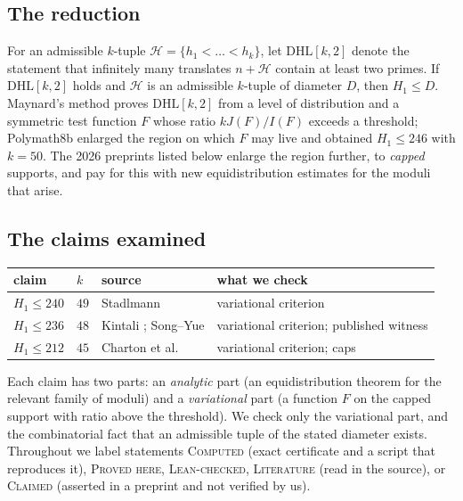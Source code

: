 \documentclass[11pt]{amsart}
\theoremstyle{definition}
\theoremstyle{remark}
\newcommand{\lbl}[1]{\textup{\textsc{#1}}}
\newcommand{\DHL}{\mathrm{DHL}}
\begin{document}
\subsection*{The reduction}
For an admissible $k$-tuple $\mathcal H=\{h_1<\dots<h_k\}$, let $\DHL[k,2]$
denote the statement that infinitely many translates $n+\mathcal H$ contain at
least two primes. If $\DHL[k,2]$ holds and $\mathcal H$ is an admissible
$k$-tuple of diameter $D$, then $H_1\le D$. Maynard's method \cite{May15}
proves $\DHL[k,2]$ from a level of distribution and a symmetric test function
$F$ whose ratio $kJ(F)/I(F)$ exceeds a threshold; Polymath8b \cite{Pol14b}
enlarged the region on which $F$ may live and obtained $H_1\le246$ with
$k=50$. The 2026 preprints listed below enlarge the region further, to
\emph{capped} supports, and pay for this with new equidistribution estimates
for the moduli that arise.

\subsection*{The claims examined}
\begin{center}
\begin{tabular}{@{}llll@{}}
\toprule
claim & $k$ & source & what we check\\
\midrule
$H_1\le240$ & $49$ & Stadlmann \cite{Sta26} & variational criterion\\
$H_1\le236$ & $48$ & Kintali \cite{Kin26}; Song--Yue \cite{SY26} & variational criterion; published witness\\
$H_1\le212$ & $45$ & Charton et al.\ \cite{Cha26} & variational criterion; caps\\
\bottomrule
\end{tabular}
\end{center}
Each claim has two parts: an \emph{analytic} part (an equidistribution
theorem for the relevant family of moduli) and a \emph{variational} part (a
function $F$ on the capped support with ratio above the threshold). We check
only the variational part, and the combinatorial fact that an admissible
tuple of the stated diameter exists. Throughout we label statements
\lbl{Computed} (exact certificate and a script that reproduces it),
\lbl{Proved here}, \lbl{Lean-checked}, \lbl{Literature} (read in the source),
or \lbl{Claimed} (asserted in a preprint and not verified by us).
\end{document}

